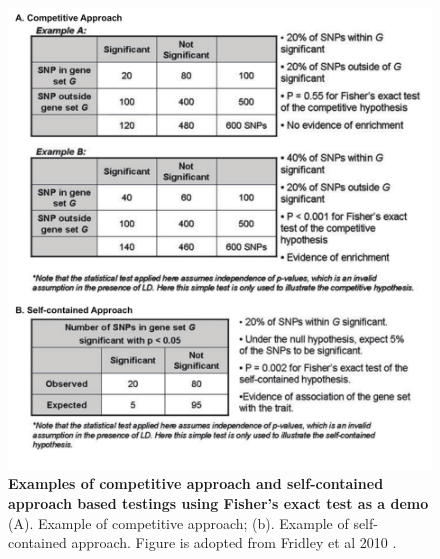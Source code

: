 \documentclass[12pt]{article}
\begin{document}
\begin{figure}[H]
\centering
\includegraphics[scale=0.5]{CompetitiveVsConstrained_illustration_example}

\caption{ \textbf{Examples of competitive approach and self-contained approach based testings using Fisher's exact test as a demo} (A). Example of competitive approach; (b). Example of self-contained approach. Figure is adopted from Fridley et al 2010 \cite{Fridley2011}. \label{fig: CompetitiveVsConstrained}}
\end{figure}
\end{document}
